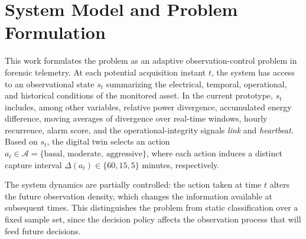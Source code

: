 \documentclass{ieeeaccess}
\begin{document}
\section{System Model and Problem Formulation}
\label{sec:system_model}
This work formulates the problem as an adaptive observation-control problem in forensic telemetry. At each potential acquisition instant $t$, the system has access to an observational state $s_t$ summarizing the electrical, temporal, operational, and historical conditions of the monitored asset. In the current prototype, $s_t$ includes, among other variables, relative power divergence, accumulated energy difference, moving averages of divergence over real-time windows, hourly recurrence, alarm score, and the operational-integrity signals \textit{link} and \textit{heartbeat}. Based on $s_t$, the digital twin selects an action $a_t \in \mathcal{A} = \{\text{basal},\, \text{moderate},\, \text{aggressive}\}$, where each action induces a distinct capture interval $\Delta(a_t) \in \{60, 15, 5\}$ minutes, respectively.

The system dynamics are partially controlled: the action taken at time $t$ alters the future observation density, which changes the information available at subsequent times. This distinguishes the problem from static classification over a fixed sample set, since the decision policy affects the observation process that will feed future decisions.
\end{document}
